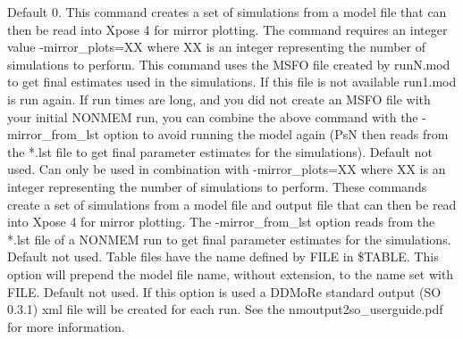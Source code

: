 \begin{optionlist}
\nextopt
{}
Default 0. This command creates a set of simulations from a model file that can then be read into Xpose 4 for mirror plotting. The command requires an integer value -mirror\_plots=XX where XX is an integer representing the number of simulations to perform. This command uses the MSFO file created by runN.mod to get final estimates used in the simulations. If this file is not available run1.mod is run again.  If run times are long, and you did not create an MSFO file with your initial NONMEM run, you can combine the above command with the -mirror\_from\_lst option to avoid running the model again (PsN then reads from the *.lst file to get final parameter estimates for the simulations). 
\nextopt
{}
Default not used. Can only be used in combination with -mirror\_plots=XX where XX is an integer representing the number of simulations to perform.  These commands create a set of simulations from a model file and output file that can then be read into Xpose 4 for mirror plotting.  The -mirror\_from\_lst option reads from the *.lst file of a NONMEM run to get final parameter estimates for the simulations. 
\nextopt
{}
Default not used. Table files have the name defined by FILE in \$TABLE. 
This option will prepend the model file name, without extension, to
the name set with FILE.
\nextopt
{}
    Default not used. If this option is used a DDMoRe standard output (SO 0.3.1) xml file will be created for each run. See the \mbox{nmoutput2so\_userguide.pdf} for more information.
\nextopt
\end{optionlist}
